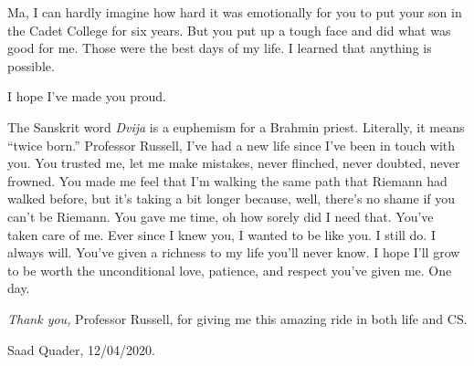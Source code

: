  Ma, I can hardly imagine how hard it was emotionally for you 
 to put your son in the Cadet College for six years. 
 But you put up a tough face and did what was good for me. 
 Those were the best days of my life. 
 I learned that anything is possible. 

 I hope I've made you proud. 

  \AckBreak
  The Sanskrit word \emph{Dvija} is a euphemism for a Brahmin priest. 
  Literally, it means ``twice born.'' 
  Professor Russell, I've had a new life since I've been in touch with you. 
  You trusted me, let me make mistakes, never flinched, never doubted, 
  never frowned. You made me feel that I'm walking the same path that Riemann had walked before, 
  but it's taking a bit longer because, well, there's no shame if you can't be Riemann. 
  You gave me time, oh how sorely did I need that. 
  You've taken care of me. 
  Ever since I knew you, I wanted to be like you. I still do. I always will. 
  You've given a richness to my life you'll never know.
  I hope I'll grow to be worth the unconditional love, patience, and respect you've given me. One day. 

  \emph{Thank you,} Professor Russell, for giving me this amazing ride 
  in both life and CS.


 \hfill Saad Quader, 12/04/2020.